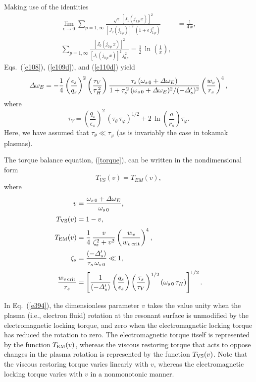 \documentclass[12pt,prb,aps]{revtex4-1}
\begin{document}
Making use of the identities 
\begin{align}\label{e417a}
\lim_{\epsilon\rightarrow 0}\sum_{p=1,\infty} \frac{\sqrt{\epsilon}\,[J_1(j_{1\,p}\,x)]^{2}}{[J_2(j_{1\,p})]^2\,(1+\epsilon\,j_{1\,p}^2)}
&=\frac{1}{4\,x},\\[0.5ex]
\sum_{p=1,\infty} \frac{[J_0(j_{0\,p}\,x)]^2}{[J_1(j_{0\,p}\,x)]^2\,j_{0\,p}^{\,2}} =\frac{1}{2}\,\ln\!\left(\frac{1}{x}\right),\label{e418a}
\end{align}
Eqs.~(\ref{e108}), (\ref{e109d}), and (\ref{e110d}) yield
\begin{equation}\label{torque}
{\mit\Delta}\omega_E =- \frac{1}{4}\left(\frac{\epsilon_s}{q_s}\right)^2\left(\frac{\tau_V}{\tau_H^{\,2}}\right)\frac{\tau_s\,(\omega_{s\,0}+{\mit\Delta}\omega_E)}{1+\tau_s^{\,2}\,(\omega_{s\,0}+{\mit\Delta}\omega_E)^2/(-{\mit\Delta}_s')^2}\left(\frac{w_v}{r_s}\right)^4,
\end{equation}
where
\begin{equation}
\tau_V = \left(\frac{q_s}{\epsilon_s}\right)^2\,(\tau_\theta\,\tau_\varphi)^{1/2} + 2\,\ln\!\left(\frac{a}{r_s}\right)\tau_\varphi.
\end{equation}
Here, we have assumed that $\tau_\theta\ll \tau_\varphi$ (as is invariably the case in tokamak plasmas). 

The torque balance equation, (\ref{torque}), can be written in the nondimensional form 
\begin{equation}\label{e394}
T_{VS}(v)= T_{EM}(v),
\end{equation}
where
\begin{align}
v&=\frac{\omega_{s\,0}+{\mit\Delta}\omega_E}{\omega_{s\,0}},\\[0.5ex]
T_{\rm VS}(v) &= 1- v,\\[0.5ex]
T_{\rm EM}(v) &= \frac{1}{4}\,\frac{v}{\zeta_s^{2}+v^2}
\left(\frac{w_v}{w_{v\,{\rm crit}}}\right)^4,\\[0.5ex]
\zeta_s &= \frac{(-{\mit\Delta}'_s)}{\tau_s\,\omega_{s\,0}}\ll 1,\\[0.5ex]
\frac{w_{v\,{\rm crit}}}{r_s}&= \left[\frac{1}{(-{\mit\Delta}'_s)}\left(\frac{q_s}{\epsilon_s}\right)\left(\frac{\tau_s}{\tau_V}\right)^{1/2}(\omega_{s\,0}\,\tau_H)\right]^{1/2}.
\end{align}

In Eq.~(\ref{e394}), the dimensionless
parameter $v$ takes the value unity when the plasma (i.e., electron fluid) rotation at the resonant surface is unmodified by
the electromagnetic locking torque, and zero when the electromagnetic locking torque has reduced the rotation to zero. The electromagnetic torque itself
is represented  by the function $T_{\rm EM}(v)$, whereas the viscous restoring torque that acts to oppose changes in the plasma rotation is represented
by the function $T_{\rm VS}(v)$. Note that the viscous restoring torque varies linearly with $v$,
whereas the electromagnetic locking torque varies with $v$ in a nonmonotonic manner.
\end{document}
